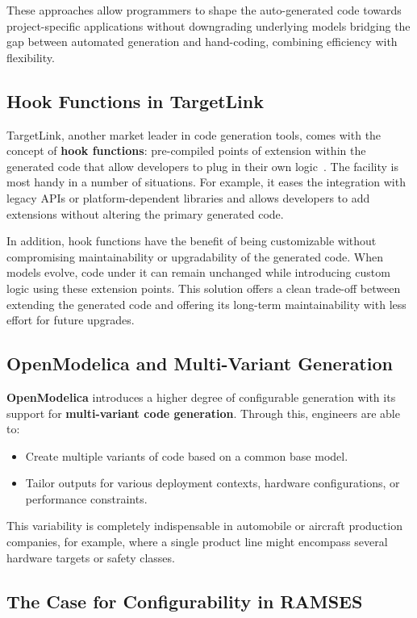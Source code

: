 These approaches allow programmers to shape the auto-generated code towards project-specific applications without downgrading underlying models bridging the gap between automated generation and hand-coding, combining efficiency with flexibility.

\subsection*{Hook Functions in TargetLink}

TargetLink, another market leader in code generation tools, comes with the concept of \textbf{hook functions}: pre-compiled points of extension within the generated code that allow developers to plug in their own logic~\cite{target_link_features}. The facility is most handy in a number of situations. For example, it eases the integration with legacy APIs or platform-dependent libraries and allows developers to add extensions without altering the primary generated code.
\par
In addition, hook functions have the benefit of being customizable without compromising maintainability or upgradability of the generated code. When models evolve, code under it can remain unchanged while introducing custom logic using these extension points. This solution offers a clean trade-off between extending the generated code and offering its long-term maintainability with less effort for future upgrades.

\subsection*{OpenModelica and Multi-Variant Generation}

\textbf{OpenModelica} introduces a higher degree of configurable generation with its support for \textbf{multi-variant code generation}. Through this, engineers are able to:
\begin{itemize} 
	\item Create multiple variants of code based on a common base model.
	\item Tailor outputs for various deployment contexts, hardware configurations, or performance constraints.
\end{itemize}

This variability is completely indispensable in automobile or aircraft production companies, for example, where a single product line might encompass several hardware targets or safety classes.


\subsection*{The Case for Configurability in RAMSES}

